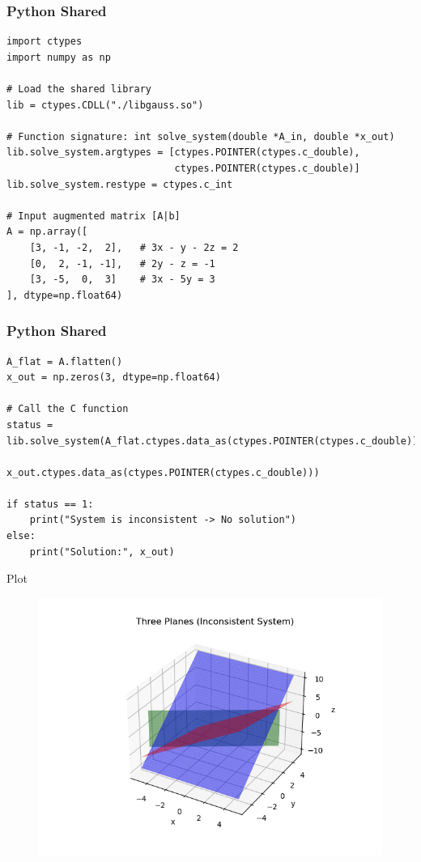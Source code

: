 \documentclass{beamer}
\begin{document}
\begin{frame}[fragile]
\frametitle{Python Shared}
\begin{lstlisting}
import ctypes
import numpy as np

# Load the shared library
lib = ctypes.CDLL("./libgauss.so")

# Function signature: int solve_system(double *A_in, double *x_out)
lib.solve_system.argtypes = [ctypes.POINTER(ctypes.c_double),
                             ctypes.POINTER(ctypes.c_double)]
lib.solve_system.restype = ctypes.c_int

# Input augmented matrix [A|b]
A = np.array([
    [3, -1, -2,  2],   # 3x - y - 2z = 2
    [0,  2, -1, -1],   # 2y - z = -1
    [3, -5,  0,  3]    # 3x - 5y = 3
], dtype=np.float64)
\end{lstlisting}
\end{frame}
\begin{frame}[fragile]
\frametitle{Python Shared}
\begin{lstlisting}
A_flat = A.flatten()
x_out = np.zeros(3, dtype=np.float64)

# Call the C function
status = lib.solve_system(A_flat.ctypes.data_as(ctypes.POINTER(ctypes.c_double)),
                          x_out.ctypes.data_as(ctypes.POINTER(ctypes.c_double)))

if status == 1:
    print("System is inconsistent -> No solution")
else:
    print("Solution:", x_out)

\end{lstlisting}
\end{frame}
\begin{frame}{Plot}
\begin{figure}
    \centering
    \includegraphics[width=0.75\linewidth]{figs/fig1.png}
    \caption{}
    \label{fig:placeholder}
\end{figure}
\end{frame}
\end{document}
